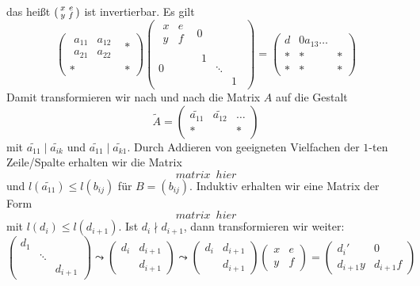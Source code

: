 das heißt $\begin{psmallmatrix}
	x & e \\
	y & f
\end{psmallmatrix}$ ist invertierbar. Es gilt 
\[
	\begin{pmatrix}
		\begin{smallmatrix}
			a_{11} & a_{12} \\
			a_{21} & a_{22}
		\end{smallmatrix} & * \\
		* & *
	\end{pmatrix} \begin{pmatrix}
		\begin{smallmatrix}
			x & e \\
			y & f
		\end{smallmatrix} & 0 \\
		0 & \begin{smallmatrix}
			1  & & \\
			& \ddots & \\
			& & 1
		\end{smallmatrix}
	\end{pmatrix} = 
	\begin{pmatrix}
		d & 0 a_{13} \ldots  \\
		* & * & * \\
		* & * & * 
	\end{pmatrix}
\]
Damit transformieren wir nach und nach die Matrix $A$ auf die Gestalt
\[
	\tilde{A} = \begin{pmatrix}
		\tilde{a_{11}} & \tilde{a_{12}} & \ldots \\
		* & & *
	\end{pmatrix}
\]
mit $\tilde{a_{11}} \mid \tilde{a_{ik}}$ und $\tilde{a_{11}} \mid \tilde{a_{k1}}$. Durch Addieren von geeigneten Vielfachen der $1$-ten Zeile/Spalte erhalten wir die 
Matrix 
\[
	matrix \enspace hier
\]
und $l(\tilde{a_11}) \le l (b_{ij})$ für $B= (b_{ij})$. Induktiv erhalten wir eine Matrix der Form
\[
	matrix \enspace hier
\]
mit $l(d_i) \le l(d_{i+1})$. Ist $d_i \nmid d_{i+1}$, dann transformieren wir weiter:
\[
	\begin{pmatrix}
		d_1 & & \\
		& \ddots & \\
		& & d_{i+1}
	\end{pmatrix} \leadsto \begin{pmatrix}
		d_i & d_{i+1} \\
		& d_{i+1}
	\end{pmatrix} \leadsto \begin{pmatrix}
		d_i & d_{i+1} \\
		& d_{i+1}
	\end{pmatrix} \begin{pmatrix}
		x & e \\
		y & f
	\end{pmatrix} = \begin{pmatrix}
		d_i' & 0 \\
		d_{i+1}y & d_{i+1} f
	\end{pmatrix}
\]
